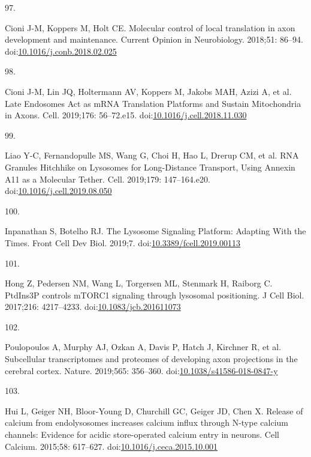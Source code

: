 \documentclass[
  12pt,
  a4paper,
]{book}
\newlength{\cslhangindent}
\newlength{\csllabelwidth}
\newlength{\cslentryspacingunit} %
\newenvironment{CSLReferences}[2] %
 {%
  \setlength{\parindent}{0pt}
  \ifodd #1
  \let\oldpar\par
  \def\par{\hangindent=\cslhangindent\oldpar}
  \fi
  \setlength{\parskip}{#2\cslentryspacingunit}
 }%
 {}
\newcommand{\CSLLeftMargin}[1]{\parbox[t]{\csllabelwidth}{#1}}
\newcommand{\CSLRightInline}[1]{\parbox[t]{\linewidth - \csllabelwidth}{#1}\break}
\begin{document}
\begin{CSLReferences}{0}{0}
\leavevmode{}%
\CSLLeftMargin{97. }%
\CSLRightInline{Cioni J-M, Koppers M, Holt CE. Molecular control of local translation in axon development and maintenance. Current Opinion in Neurobiology. 2018;51: 86--94. doi:\href{https://doi.org/10.1016/j.conb.2018.02.025}{10.1016/j.conb.2018.02.025}}

\leavevmode{}%
\CSLLeftMargin{98. }%
\CSLRightInline{Cioni J-M, Lin JQ, Holtermann AV, Koppers M, Jakobs MAH, Azizi A, et al. Late {Endosomes Act} as {mRNA Translation Platforms} and {Sustain Mitochondria} in {Axons}. Cell. 2019;176: 56--72.e15. doi:\href{https://doi.org/10.1016/j.cell.2018.11.030}{10.1016/j.cell.2018.11.030}}

\leavevmode{}%
\CSLLeftMargin{99. }%
\CSLRightInline{Liao Y-C, Fernandopulle MS, Wang G, Choi H, Hao L, Drerup CM, et al. {RNA Granules Hitchhike} on {Lysosomes} for {Long-Distance Transport}, {Using Annexin A11} as a {Molecular Tether}. Cell. 2019;179: 147--164.e20. doi:\href{https://doi.org/10.1016/j.cell.2019.08.050}{10.1016/j.cell.2019.08.050}}

\leavevmode{}%
\CSLLeftMargin{100. }%
\CSLRightInline{Inpanathan S, Botelho RJ. The {Lysosome Signaling Platform}: {Adapting With} the {Times}. Front Cell Dev Biol. 2019;7. doi:\href{https://doi.org/10.3389/fcell.2019.00113}{10.3389/fcell.2019.00113}}

\leavevmode{}%
\CSLLeftMargin{101. }%
\CSLRightInline{Hong Z, Pedersen NM, Wang L, Torgersen ML, Stenmark H, Raiborg C. {PtdIns3P} controls {mTORC1} signaling through lysosomal positioning. J Cell Biol. 2017;216: 4217--4233. doi:\href{https://doi.org/10.1083/jcb.201611073}{10.1083/jcb.201611073}}

\leavevmode{}%
\CSLLeftMargin{102. }%
\CSLRightInline{Poulopoulos A, Murphy AJ, Ozkan A, Davis P, Hatch J, Kirchner R, et al. Subcellular transcriptomes and proteomes of developing axon projections in the cerebral cortex. Nature. 2019;565: 356--360. doi:\href{https://doi.org/10.1038/s41586-018-0847-y}{10.1038/s41586-018-0847-y}}

\leavevmode{}%
\CSLLeftMargin{103. }%
\CSLRightInline{Hui L, Geiger NH, Bloor-Young D, Churchill GC, Geiger JD, Chen X. Release of calcium from endolysosomes increases calcium influx through {N-type} calcium channels: {Evidence} for acidic store-operated calcium entry in neurons. Cell Calcium. 2015;58: 617--627. doi:\href{https://doi.org/10.1016/j.ceca.2015.10.001}{10.1016/j.ceca.2015.10.001}}


\end{CSLReferences}
\end{document}

